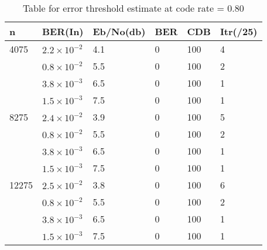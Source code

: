 \begin{table}[H]
\centering
\caption[Table for error threshold estimate at code rate = 0.80, Min Sum decode using quasi cyclic matrix]{Table for error threshold estimate at code rate = 0.80}
\begin{tabular}{|l|l|l|l|l|l|}
\hline
n     & BER(In)  	& Eb/No(db) & BER & CDB & Itr(/25) \\ \hline
4075  &	$2.2\times10^{-2}$ & 4.1   & 0   & 100 & 4         \\  \hline
	  &	$0.8\times10^{-2}$ & 5.5   & 0   & 100 & 2         \\
      &	$3.8\times10^{-3}$ & 6.5   & 0   & 100 & 1         \\ 
      &	$1.5\times10^{-3}$ & 7.5   & 0   & 100 & 1         \\ \hline
8275  &	$2.4\times10^{-2}$ & 3.9   & 0   & 100 & 5         \\  \hline
	  &	$0.8\times10^{-2}$ & 5.5   & 0   & 100 & 2         \\ 
      &	$3.8\times10^{-3}$ & 6.5   & 0   & 100 & 1         \\ 
      &	$1.5\times10^{-3}$ & 7.5   & 0   & 100 & 1         \\ \hline
12275 &	$2.5\times10^{-2}$ & 3.8   & 0   & 100 & 6         \\ \hline
      &	$0.8\times10^{-2}$ & 5.5   & 0   & 100 & 2         \\  
      &	$3.8\times10^{-3}$ & 6.5   & 0   & 100 & 1         \\
      &	$1.5\times10^{-3}$ & 7.5   & 0   & 100 & 1         \\ \hline
\end{tabular}
\label{tab:nameForThisTable}
\end{table}



